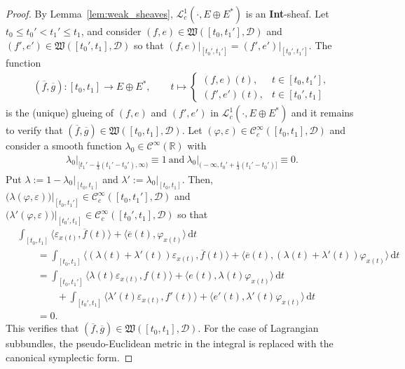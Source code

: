 \documentclass[preprint,12pt]{elsarticle}
\theoremstyle{definition}
\begin{document}
\begin{proof}
By Lemma~\ref{lem:weak_sheaves}, $\mathcal{L}^1_c(\cdot,E\oplus E^*)$ is an \textbf{Int}-sheaf. Let $t_0\leq t_0'<t_1'\leq t_1$, and consider $(f,e)\in\mathfrak{W}([t_0,t_1'],\mathcal{D})$ and $(f',e')\in\mathfrak{W}([t_0',t_1],\mathcal{D})$ so that $(f,e)\vert_{[t_0',t_1']} = (f',e')\vert_{[t_0',t_1']}$. The function
\begin{align*}
(\overline{f},\overline{g}):[t_0,t_1]\to E\oplus E^*,\qquad t\mapsto \begin{cases}
(f,e)(t), & t\in [t_0,t_1'],\\
(f',e')(t), & t\in [t_0',t_1]
\end{cases}
\end{align*}
is the (unique) glueing of $(f,e)$ and $(f',e')$ in $\mathcal{L}^1_c(\cdot,E\oplus E^*)$ and it remains to verify that $(\overline{f},\overline{g})\in \mathfrak{W}([t_0,t_1],\mathcal{D})$. Let $(\varphi,\varepsilon)\in\mathcal{C}_c^\infty([t_0,t_1],\mathcal{D})$ and consider a smooth function $\lambda_0\in\mathcal{C}^\infty(\mathbb{R})$ with
\begin{align*}
\lambda_0\vert_{\big[t_1'-\frac{1}{3}(t_1'-t_0'),\infty\big)}\equiv 1~\mathrm{and}~\lambda_0\vert_{\big(-\infty,t_0'+\frac{1}{3}(t_1'-t_0')\big]}\equiv 0.
\end{align*}
Put $\lambda := 1-\lambda_0\vert_{[t_0,t_1]}$ and $\lambda':=\lambda_0\vert_{[t_0,t_1]}$. Then, $\big(\lambda(\varphi,\varepsilon)\big)\vert_{[t_0,t_1']}\in\mathcal{C}_c^\infty([t_0,t_1'],\mathcal{D})$ and $\big(\lambda'(\varphi,\varepsilon)\big)\vert_{[t_0',t_1]}\in\mathcal{C}_c^\infty([t_0',t_1],\mathcal{D})$ so that
\begin{align*}
& \int_{[t_0,t_1]} \langle \varepsilon_{x(t)},\overline{f}(t)\rangle+\langle \overline{e}(t),\varphi_{x(t)}\rangle\,\mathrm{d}t\\
&\qquad = \int_{[t_0,t_1]} \langle (\lambda(t)+\lambda'(t))\varepsilon_{x(t)},\overline{f}(t)\rangle+\langle \overline{e}(t),(\lambda(t)+\lambda'(t))\varphi_{x(t)}\rangle\,\mathrm{d}t\\
&\qquad = \int_{[t_0,t_1']} \langle \lambda(t)\varepsilon_{x(t)},{f}(t)\rangle+\langle {e}(t),\lambda(t)\varphi_{x(t)}\rangle\,\mathrm{d}t\\
&\qquad\qquad + \int_{[t_0',t_1]} \langle \lambda'(t)\varepsilon_{x(t)},{f'}(t)\rangle+\langle {e'}(t),\lambda'(t)\varphi_{x(t)}\rangle\,\mathrm{d}t\\
&\qquad = 0.
\end{align*}
This verifies that $(\overline{f},\overline{g})\in \mathfrak{W}([t_0,t_1],\mathcal{D})$. For the case of Lagrangian subbundles, the pseudo-Euclidean metric in the integral is replaced with the canonical symplectic form.
\end{proof}
\end{document}
